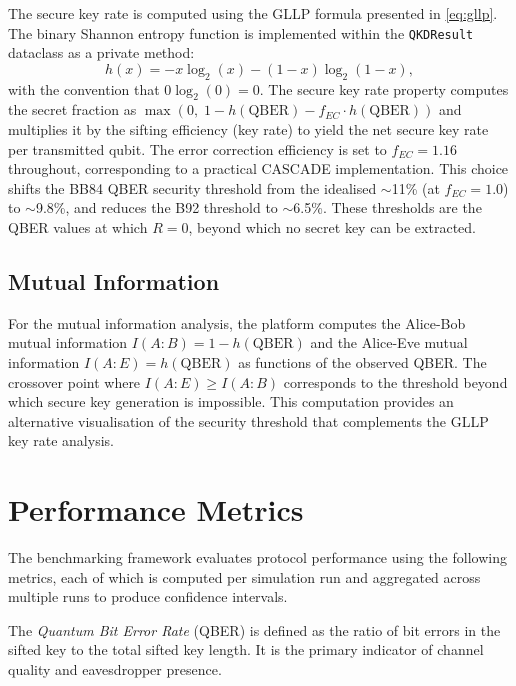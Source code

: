 \documentclass[10pt, a4paper]{report}
\begin{document}
The secure key rate is computed using the GLLP formula presented in \cref{eq:gllp}. The binary Shannon entropy function is implemented within the \texttt{QKDResult} dataclass as a private method:
%
\begin{equation}
\label{eq:binary-entropy}
h(x) = -x \log_2(x) - (1 - x) \log_2(1 - x),
\end{equation}
%
with the convention that $0 \log_2(0) = 0$. The secure key rate property computes the secret fraction as $\max(0,\; 1 - h(\text{QBER}) - f_{EC} \cdot h(\text{QBER}))$ and multiplies it by the sifting efficiency (key rate) to yield the net secure key rate per transmitted qubit. The error correction efficiency is set to $f_{EC} = 1.16$ throughout, corresponding to a practical CASCADE implementation. This choice shifts the BB84 QBER security threshold from the idealised $\sim$11\% (at $f_{EC} = 1.0$) to $\sim$9.8\%, and reduces the B92 threshold to $\sim$6.5\%. These thresholds are the QBER values at which $R = 0$, beyond which no secret key can be extracted.

\subsection{Mutual Information}

For the mutual information analysis, the platform computes the Alice-Bob mutual information $I(A{:}B) = 1 - h(\text{QBER})$ and the Alice-Eve mutual information $I(A{:}E) = h(\text{QBER})$ as functions of the observed QBER. The crossover point where $I(A{:}E) \geq I(A{:}B)$ corresponds to the threshold beyond which secure key generation is impossible. This computation provides an alternative visualisation of the security threshold that complements the GLLP key rate analysis.


\section{Performance Metrics}

The benchmarking framework evaluates protocol performance using the following metrics, each of which is computed per simulation run and aggregated across multiple runs to produce confidence intervals.

The \textit{Quantum Bit Error Rate} (QBER) is defined as the ratio of bit errors in the sifted key to the total sifted key length. It is the primary indicator of channel quality and eavesdropper presence.
\end{document}
